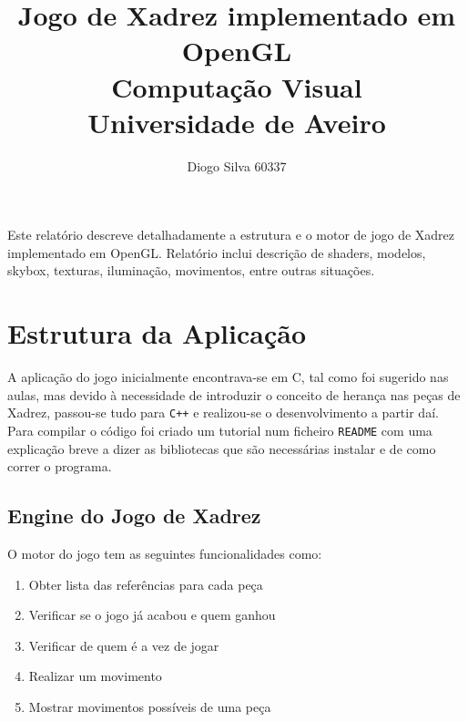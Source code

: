 \documentclass[portugues,final]{revdetua}
\begin{document}

\title{\textbf{Jogo de Xadrez implementado em OpenGL} \\ Computação Visual\\Universidade de Aveiro}
\author{Diogo Silva 60337}
\maketitle
\begin{resumo} %
Este relatório descreve detalhadamente a estrutura e o motor de jogo de Xadrez implementado em OpenGL.
Relatório inclui descrição de shaders, modelos, skybox, texturas, iluminação, movimentos, entre outras situações.
\end{resumo}


\section{Estrutura da Aplicação}

A aplicação do jogo inicialmente encontrava-se em C, tal como foi sugerido nas aulas, mas devido à necessidade de introduzir o conceito de herança nas peças de Xadrez, passou-se tudo para {\tt C++} e realizou-se o desenvolvimento a partir daí.\\

Para compilar o código foi criado um tutorial num ficheiro {\tt README} com uma explicação breve a dizer as bibliotecas que são necessárias instalar e de como correr o programa.

\subsection{Engine do Jogo de Xadrez}

O motor do jogo tem as seguintes funcionalidades como:
\begin{enumerate}
\item{Obter lista das referências para cada peça}
\item{Verificar se o jogo já acabou e quem ganhou}
\item{Verificar de quem é a vez de jogar}
\item{Realizar um movimento}
\item{Mostrar movimentos possíveis de uma peça}
\end{enumerate}
\end{document}
